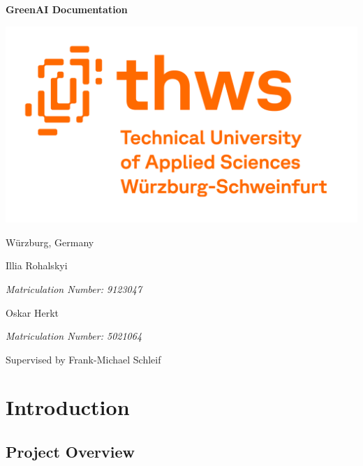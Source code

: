 \documentclass{report}
\begin{document}
\begin{titlepage}
    \centerline{\Huge\textbf{GreenAI Documentation}}
    
    \vspace*{1cm}
    
    \centerline{\includegraphics[width=16cm]{thws_logo.png}}
    
    \vspace*{1.5cm}
    
    \centerline{\LARGE Würzburg, Germany}
    
    \vspace*{1cm}
    
    \centerline{\Large{Illia Rohalskyi}}
    \vspace{0.2cm}
    \centerline{\large\textit{Matriculation Number: 9123047}}



    \vspace*{0.5cm}
    
    \centerline{\Large{Oskar Herkt}}
    \vspace{0.2cm}
    \centerline{\large\textit{Matriculation Number: 5021064}}
    
    \vspace*{1cm}
    
    \centerline{\LARGE{Supervised by Frank-Michael Schleif}}
    
        
\end{titlepage}

\tableofcontents

\chapter{Introduction}

\section{Project Overview}
\end{document}
